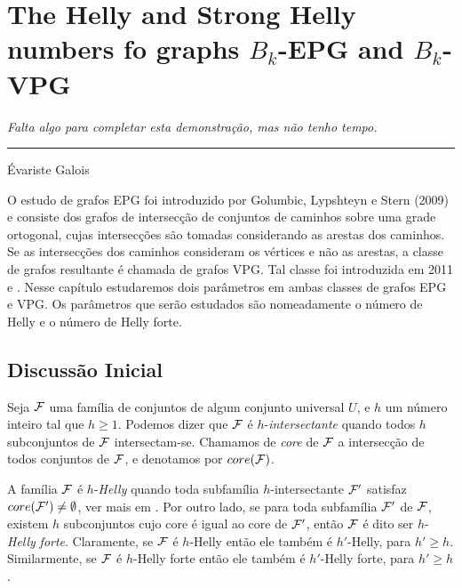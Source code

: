 \chapter{The Helly and Strong Helly numbers fo graphs $B_k$-EPG and $B_k$-VPG}
\label{cap:iv}

\begin{flushright}
\begin{minipage}[t][0cm][b]{0.47\textwidth}
\emph{
Falta algo para completar esta demonstração, mas não tenho tempo.}
\end{minipage}

\rule[0cm]{7cm}{0.03cm}%

Évariste Galois
\end{flushright}




O estudo de grafos EPG foi introduzido por  Golumbic, Lypshteyn e Stern (2009) e consiste dos grafos de intersecção de conjuntos de caminhos sobre uma grade ortogonal, cujas intersecções são tomadas considerando as arestas dos caminhos. Se as intersecções dos caminhos consideram os vértices e não as arestas, a classe de grafos resultante é chamada de grafos VPG. Tal classe foi introduzida em 2011 \cite{asinowski2011string} e \cite{asinowski2012}. Nesse capítulo estudaremos dois parâmetros em ambas classes de grafos EPG e VPG. Os parâmetros que serão estudados são nomeadamente o número de Helly e o número de Helly forte.

\section{Discussão Inicial}

Seja  $\cal {F}$ uma família de conjuntos de algum conjunto universal $U$, e $h$ um número inteiro tal que $h\geq 1$. Podemos dizer que $\cal{F}$ é $h$-{\it intersectante} quando todos  $h$ subconjuntos de $\cal {F}$ intersectam-se. Chamamos de {\it core} de $\cal {F}$ a intersecção de todos conjuntos de $\cal {F}$, e denotamos por $core(\cal F)$. 

A família $\cal{F}$ é $h$-{\it Helly} quando toda subfamília $h$-intersectante $\cal{F'}$ satisfaz $core(\cal{F'}) \neq \emptyset$, ver mais em \cite{duchet1978propriete}. Por outro lado, se para toda subfamília $\cal{F'}$ de $\cal{F}$, existem $h$ subconjuntos cujo core é igual ao core de  $\cal {F'}$, então $\cal {F}$ é dito ser  $h$-{\it Helly} {\it forte}. Claramente, se $\cal {F}$ é $h$-Helly então ele também é $h'$-Helly, para $h' \geq h$. Similarmente, se ${\cal F}$ é $h$-Helly forte então ele também é $h'$-Helly forte, para $h' \geq h$. 

